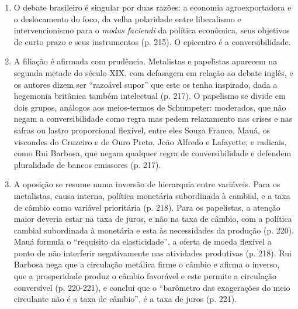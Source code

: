 \begin{enumerate}[leftmargin=*,nosep]
\item O debate brasileiro é singular por duas razões: a economia
agroexportadora e o deslocamento do foco, da velha polaridade entre
liberalismo e intervencionismo para o \emph{modus faciendi} da política
econômica, seus objetivos de curto prazo e seus instrumentos (p. 215). O
epicentro é a conversibilidade.


\item A filiação é afirmada com prudência. Metalistas e papelistas aparecem na
segunda metade do século XIX, com defasagem em relação ao debate inglês, e os
autores dizem ser ``razoável supor'' que este os tenha inspirado, dada a
hegemonia britânica também intelectual (p. 217). O papelismo se divide em dois
grupos, análogos aos meios-termos de Schumpeter: moderados, que não negam a
conversibilidade como regra mas pedem relaxamento nas crises e nas safras ou
lastro proporcional flexível, entre eles Souza Franco, Mauá, os viscondes do
Cruzeiro e de Ouro Preto, João Alfredo e Lafayette; e radicais, como Rui
Barbosa, que negam qualquer regra de conversibilidade e defendem pluralidade
de bancos emissores (p. 217).

\item A oposição se resume numa inversão de hierarquia entre variáveis. Para
os metalistas, causa interna, política monetária subordinada à cambial, e a
taxa de câmbio como variável prioritária (p. 218). Para os papelistas, a
atenção maior deveria estar na taxa de juros, e não na taxa de câmbio, com a
política cambial subordinada à monetária e esta às necessidades da produção
(p. 220). Mauá formula o ``requisito da elasticidade'', a oferta de moeda
flexível a ponto de não interferir negativamente nas atividades produtivas
(p. 218). Rui Barbosa nega que a circulação metálica firme o câmbio e afirma o
inverso, que a prosperidade produz o câmbio favorável e este permite a
circulação conversível (p. 220-221), e conclui que o ``barômetro das
exagerações do meio circulante não é a taxa de câmbio'', é a taxa de juros
(p. 221).
\end{enumerate}

